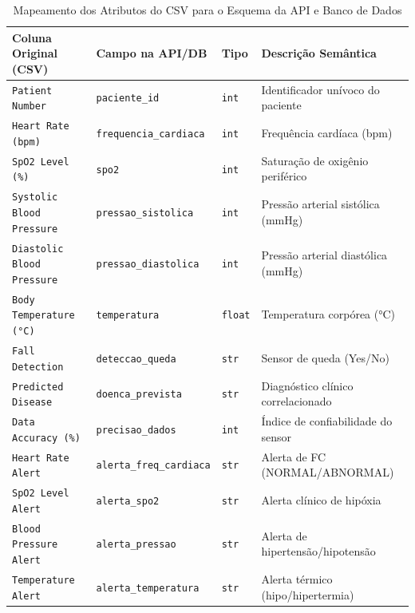 \documentclass[12pt,a4paper]{article}
\begin{document}
	\begin{table}[H]
		\centering
		\footnotesize
		\caption{Mapeamento dos Atributos do CSV para o Esquema da API e Banco de Dados}
		\label{tab:schema_map}
		\begin{tabularx}{\textwidth}{p{4.2cm} p{4.2cm} p{1.2cm} X}
			\toprule
			\textbf{Coluna Original (CSV)} & \textbf{Campo na API/DB} & \textbf{Tipo} & \textbf{Descrição Semântica} \\
			\midrule
			\texttt{Patient Number} & \texttt{paciente\_id} & \texttt{int} & Identificador unívoco do paciente \\
			\texttt{Heart Rate (bpm)} & \texttt{frequencia\_cardiaca} & \texttt{int} & Frequência cardíaca (bpm) \\
			\texttt{SpO2 Level (\%)} & \texttt{spo2} & \texttt{int} & Saturação de oxigênio periférico \\
			\texttt{Systolic Blood Pressure} & \texttt{pressao\_sistolica} & \texttt{int} & Pressão arterial sistólica (mmHg) \\
			\texttt{Diastolic Blood Pressure} & \texttt{pressao\_diastolica} & \texttt{int} & Pressão arterial diastólica (mmHg) \\
			\texttt{Body Temperature (°C)} & \texttt{temperatura} & \texttt{float} & Temperatura corpórea (°C) \\
			\texttt{Fall Detection} & \texttt{deteccao\_queda} & \texttt{str} & Sensor de queda (Yes/No) \\
			\texttt{Predicted Disease} & \texttt{doenca\_prevista} & \texttt{str} & Diagnóstico clínico correlacionado \\
			\texttt{Data Accuracy (\%)} & \texttt{precisao\_dados} & \texttt{int} & Índice de confiabilidade do sensor \\
			\texttt{Heart Rate Alert} & \texttt{alerta\_freq\_cardiaca} & \texttt{str} & Alerta de FC (NORMAL/ABNORMAL) \\
			\texttt{SpO2 Level Alert} & \texttt{alerta\_spo2} & \texttt{str} & Alerta clínico de hipóxia \\
			\texttt{Blood Pressure Alert} & \texttt{alerta\_pressao} & \texttt{str} & Alerta de hipertensão/hipotensão \\
			\texttt{Temperature Alert} & \texttt{alerta\_temperatura} & \texttt{str} & Alerta térmico (hipo/hipertermia) \\
			\bottomrule
		\end{tabularx}
	\end{table}
	
\end{document}
